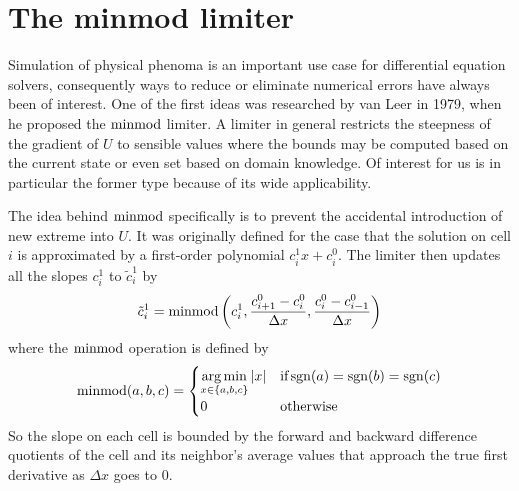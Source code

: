 \section{The minmod limiter}
\label{sec:minmod}

Simulation of physical phenoma is an important use case for differential equation solvers, consequently ways to reduce or eliminate numerical errors have always been of interest.
One of the first ideas was researched by van Leer in 1979, when he proposed the $\operatorname{minmod}$ limiter\cite{VanLeer1979}.
A limiter in general restricts the steepness of the gradient of $U$ to sensible values where the bounds may be computed based on the current state or even set based on domain knowledge.
Of interest for us is in particular the former type because of its wide applicability.

The idea behind $\operatorname{minmod}$ specifically is to prevent the accidental introduction of new extreme into $U$.
It was originally defined for the case that the solution on cell $i$ is approximated by a first-order polynomial $c_{i}^{1}x + c_{i}^{0}$.
The limiter then updates all the slopes $c_{i}^{1}$ to $\tilde{c}_{i}^{1}$ by
\begin{equation*}
  \tilde{c}_{i}^{1} = \operatorname{minmod}\left( c_{i}^{1}, \frac{c_{i + 1}^{0} - c_{i}^{0}}{\Delta x}, \frac{c_{i}^{0} - c_{i - 1}^{0}}{\Delta x} \right)
\end{equation*}
where the $\operatorname{minmod}$ operation is defined by
\begin{equation*}
  \operatorname{minmod}(a, b, c) = \begin{cases}
    \displaystyle\operatorname*{arg\,min}_{x \in \{ a, b, c \}} |x| & \text{if} \operatorname{sgn}(a) = \operatorname{sgn}(b) = \operatorname{sgn}(c)\\
    0 & \text{otherwise}
  \end{cases}
\end{equation*}
So the slope on each cell is bounded by the forward and backward difference quotients of the cell and its neighbor's average values that approach the true first derivative as $\Delta x$ goes to $0$.

